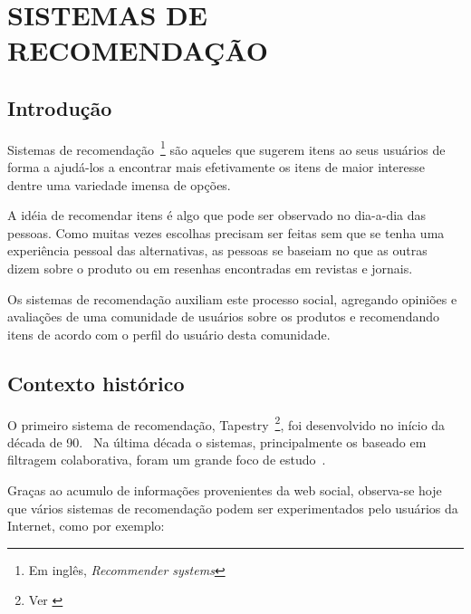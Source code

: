 \chapter{SISTEMAS DE RECOMENDAÇÃO} %
\label{cha:sistemas_de_recomendação}

\section{Introdução}
Sistemas de recomendação~\footnote{Em inglês, \textit{Recommender systems}} são aqueles que sugerem itens ao seus usuários de forma a ajudá-los a encontrar mais efetivamente os itens de maior interesse dentre uma variedade imensa de opções.

A idéia de recomendar itens é algo que pode ser observado no dia-a-dia das pessoas. Como muitas vezes escolhas precisam ser feitas sem que se tenha uma experiência pessoal das alternativas, as pessoas se baseiam no que as outras dizem sobre o produto ou em resenhas encontradas em revistas e jornais.

Os sistemas de recomendação auxiliam este processo social, agregando opiniões e avaliações de uma comunidade de usuários sobre os produtos e recomendando itens de acordo com o perfil do usuário desta comunidade.

\section{Contexto histórico}
O primeiro sistema de recomendação, Tapestry~\footnote{Ver \cite{Goldberg92}}, foi desenvolvido no início da década de 90.~\cite{Resnick97} Na última década o sistemas, principalmente os baseado em filtragem colaborativa, foram um grande foco de estudo~\cite{Herlocker04}.

Graças ao acumulo de informações provenientes da web social, observa-se hoje que vários sistemas de recomendação podem ser experimentados pelo usuários da Internet, como por exemplo:

